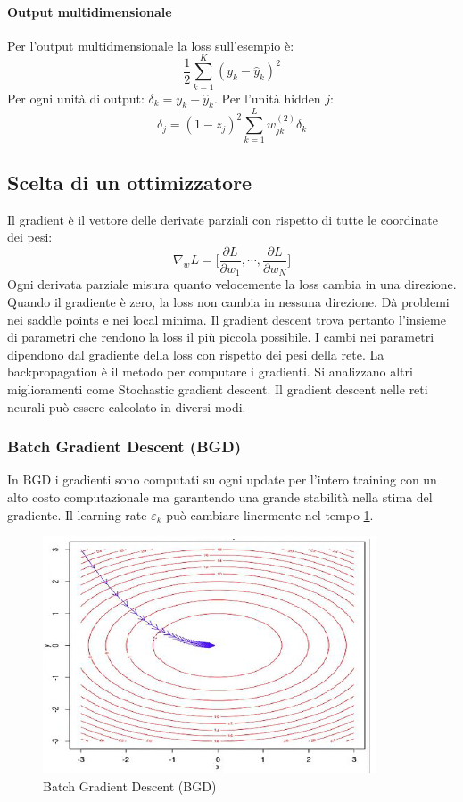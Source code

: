 		\paragraph{Output multidimensionale}
		Per l'output multidmensionale la loss sull'esempio \`e:
		$$\frac{1}{2}\sum\limits_{k = 1}^K(y_k-\hat{y}_k)^2$$
		Per ogni unit\`a di output: $\delta_k = y_k - \hat{y}_k$.
		Per l'unit\`a hidden $j$:
		$$\delta_j = (1-z_j)^2\sum\limits_{k=1}^Lw_{jk}^{(2)}\delta_k$$

	\subsection{Scelta di un ottimizzatore}
	Il gradient \`e il vettore delle derivate parziali con rispetto di tutte le coordinate dei pesi:
	$$\nabla_w L = \bigl[\frac{\partial L}{\partial w_1}, \cdots, \frac{\partial L}{\partial w_N}\bigr]$$
	Ogni derivata parziale misura quanto velocemente la loss cambia in una direzione.
	Quando il gradiente \`e zero, la loss non cambia in nessuna direzione.
	D\`a problemi nei saddle points e nei local minima.
	Il gradient descent trova pertanto l'insieme di parametri che rendono la loss il pi\`u piccola possibile.
	I cambi nei parametri dipendono dal gradiente della loss con rispetto dei pesi della rete.
	La backpropagation \`e il metodo per computare i gradienti.
	Si analizzano altri miglioramenti come Stochastic gradient descent.
	Il gradient descent nelle reti neurali pu\`o essere calcolato in diversi modi.

		\subsubsection{Batch Gradient Descent (BGD)}
		In BGD i gradienti sono computati su ogni update per l'intero training con un alto costo computazionale ma garantendo una grande stabilit\`a nella stima del gradiente.
		Il learning rate $\varepsilon_k$ pu\`o cambiare linermente nel tempo \ref{fig:chapter11-10}.\\
		
		
		\begin{figure}
			\centering
			\includegraphics[width=0.6\linewidth]{imgs/chapter11/img10}
			\caption{Batch Gradient Descent (BGD)}
			\label{fig:chapter11-10}
		\end{figure}
		
